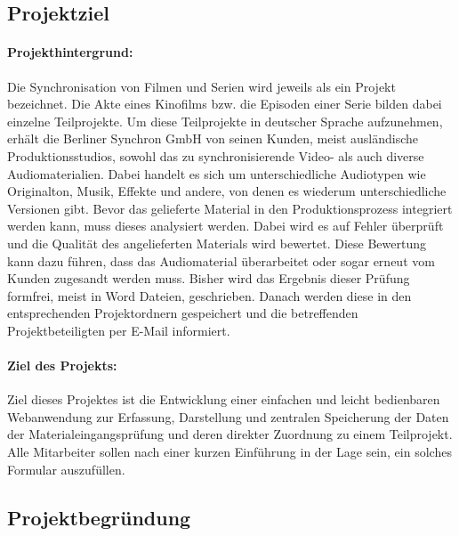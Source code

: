 \subsection{Projektziel} 
\label{sec:Projektziel}
\paragraph*{Projekthintergrund: } Die Synchronisation von Filmen und Serien wird jeweils als ein Projekt bezeichnet. Die Akte eines Kinofilms bzw. die Episoden einer Serie bilden dabei einzelne Teilprojekte. Um diese Teilprojekte in deutscher Sprache aufzunehmen, erhält die Berliner Synchron GmbH von seinen Kunden, meist ausländische Produktionsstudios, sowohl das zu synchronisierende Video- als auch diverse Audiomaterialien. Dabei handelt es sich um unterschiedliche Audiotypen wie Originalton, Musik, Effekte und andere, von denen es wiederum unterschiedliche Versionen gibt. Bevor das gelieferte Material in den Produktionsprozess integriert werden kann, muss dieses analysiert werden. Dabei wird es auf Fehler überprüft und die Qualität des angelieferten Materials wird bewertet. Diese Bewertung kann dazu führen, dass das Audiomaterial überarbeitet oder sogar erneut vom Kunden zugesandt werden muss. Bisher wird das Ergebnis dieser Prüfung formfrei, meist in Word Dateien, geschrieben. Danach werden diese in den entsprechenden Projektordnern gespeichert und die betreffenden Projektbeteiligten per E-Mail informiert.

\paragraph*{Ziel des Projekts: } Ziel dieses Projektes ist die Entwicklung einer einfachen und leicht bedienbaren Webanwendung zur Erfassung, Darstellung und zentralen Speicherung der Daten der Materialeingangsprüfung und deren direkter Zuordnung zu einem Teilprojekt. Alle Mitarbeiter sollen nach einer kurzen Einführung in der Lage sein, ein solches Formular auszufüllen.

\subsection{Projektbegründung} 
\label{sec:Projektbegruendung}
